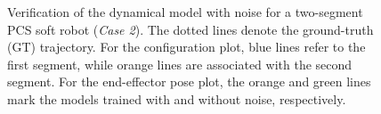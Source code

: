 
\begin{figure}[htbp]
    \centering

    \caption{Verification of the dynamical model with noise for a two-segment PCS soft robot (\emph{Case 2}). The dotted lines denote the ground-truth (GT) trajectory. For the configuration plot, blue lines refer to the first segment, while orange lines are associated with the second segment. For the end-effector pose plot, the orange and green lines mark the models trained with and without noise, respectively.}
    \label{fig:pcsregression:predict_ns-2}
\end{figure}

